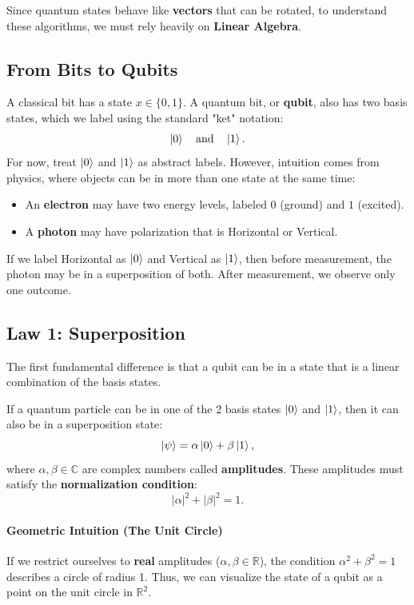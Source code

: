 Since quantum states behave like \textbf{vectors} that can be rotated, to understand these algorithms, we must rely heavily on \textbf{Linear Algebra}.

\subsection{From Bits to Qubits}

A classical bit has a state $x \in \{0, 1\}$.
A quantum bit, or \textbf{qubit}, also has two basis states, which we label using the standard "ket" notation:
\[
    \ket{0} \quad \text{and} \quad \ket{1}.
\]
For now, treat $\ket{0}$ and $\ket{1}$ as abstract labels. However, intuition comes from physics, where objects can be in more than one state at the same time:
\begin{itemize}
    \item An \textbf{electron} may have two energy levels, labeled $0$ (ground) and $1$ (excited).
    \item A \textbf{photon} may have polarization that is Horizontal or Vertical.
\end{itemize}
If we label Horizontal as $\ket{0}$ and Vertical as $\ket{1}$, then before measurement, the photon may be in a superposition of both. After measurement, we observe only one outcome.

\subsection{Law 1: Superposition}

The first fundamental difference is that a qubit can be in a state that is a linear combination of the basis states.

\begin{definition} If a quantum particle can be in one of the 2 basis states $\ket{0}$ and $\ket{1}$, then it can also be in a superposition state:
\[
    \ket{\psi} = \alpha\ket{0} + \beta\ket{1},
\]
where $\alpha, \beta \in \mathbb{C}$ are complex numbers called \textbf{amplitudes}.
These amplitudes must satisfy the \textbf{normalization condition}:
\[
    |\alpha|^2 + |\beta|^2 = 1.
\]
\end{definition}

\paragraph{Geometric Intuition (The Unit Circle)}
If we restrict ourselves to \textbf{real} amplitudes ($\alpha, \beta \in \mathbb{R}$), the condition $\alpha^2 + \beta^2 = 1$ describes a circle of radius 1.
Thus, we can visualize the state of a qubit as a point on the unit circle in $\mathbb{R}^2$.

